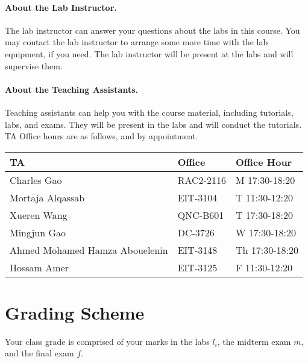 \documentclass[letterpaper,10pt]{article}
\begin{document}
\paragraph{About the Lab Instructor.}

The lab instructor can answer your questions about the labs in this course. You may contact the lab instructor to arrange some more time with the lab equipment, if you need. The lab instructor will be present at the labs and will supervise them.

\paragraph{About the Teaching Assistants.}

Teaching assistants can help you with the course material, including tutorials, labs, and exams. They will be present in the labs and will conduct the tutorials. TA Office hours are as follows, and by appointment.

\begin{table}[h]
        \begin{center}
        \begin{tabular}{l|l|l}
        							\textbf{TA} & \textbf{Office} & \textbf{Office Hour} \\ \hline
									 Charles Gao & RAC2-2116 & M 17:30-18:20 \\
									 Mortaja Alqassab & EIT-3104 & T 11:30-12:20 \\
									 Xueren Wang & QNC-B601 & T 17:30-18:20 \\
                                     Mingjun Gao & DC-3726 & W 17:30-18:20 \\
									 Ahmed Mohamed Hamza Abouelenin & EIT-3148 & Th 17:30-18:20 \\
                                    Hossam Amer & EIT-3125 & F 11:30-12:20 \\

		\end{tabular}
        \end{center}
\end{table}
\vspace{-2em}

\section*{Grading Scheme}

Your class grade is comprised of your marks in the labs $l_{i}$, the midterm exam $m$, and the final exam $f$.
\end{document}
